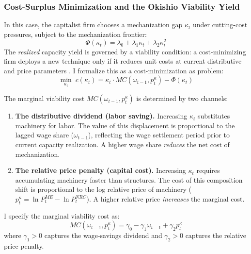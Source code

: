 \subsubsection{Cost-Surplus Minimization and the Okishio
	Viability Yield}

In this case, the capitalist firm chooses a mechanization gap $\kappa_t$ under cutting-cost pressures, subject to the
mechanization frontier:
\begin{equation}
	\Phi(\kappa_t) = \lambda_0 + \lambda_1 \kappa_t
	+ \lambda_2 \kappa_t^2
	\label{eq:32:frontier_kappa}
\end{equation}
The \textit{realized} capacity yield is governed by a viability condition: a
cost-minimizing firm deploys a new technique only if it
reduces unit costs at current distributive and price
parameters \citep{Okishio1961, Basu2022}. I formalize
this as a cost-minimization as problem:
\begin{equation}
	\min_{\kappa_t}\; c(\kappa_t)
	= \kappa_t \cdot MC(\omega_{t-1}, p^\kappa_t) -\Phi(\kappa_t)
	\label{eq:32:objective_kappa}
\end{equation}

The marginal viability cost $MC(\omega_{t-1}, p^\kappa_t)$
is determined by two channels:
\begin{enumerate}
	\item \textbf{The distributive dividend (labor saving).}
	Increasing $\kappa_t$ substitutes machinery for labor. The
	value of this displacement is proportional to the lagged
	wage share ($\omega_{t-1}$), reflecting the wage
	settlement period prior to current capacity realization.
	A higher wage share \textit{reduces} the net cost of
	mechanization.
	\item \textbf{The relative price penalty (capital cost).}
	Increasing $\kappa_t$ requires accumulating machinery
	faster than structures. The cost of this composition shift
	is proportional to the log relative price of machinery
	($p^\kappa_t = \ln P^{ME}_t - \ln P^{NRC}_t$). A higher
	relative price \textit{increases} the marginal cost.
\end{enumerate}
I specify the marginal viability cost as:
\begin{equation}
	MC(\omega_{t-1}, p^\kappa_t)
	= \gamma_0 - \gamma_1 \omega_{t-1} + \gamma_2 p^\kappa_t
	\label{eq:32:MC}
\end{equation}
where $\gamma_1 > 0$ captures the wage-savings dividend and
$\gamma_2 > 0$ captures the relative price penalty.


